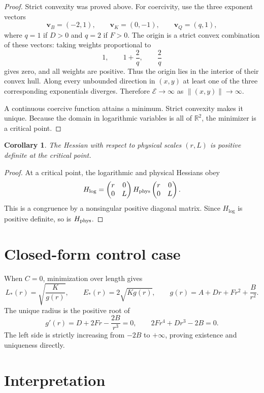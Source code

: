 \documentclass[11pt]{article}
\newtheorem{cor}{Corollary}
\begin{document}
\begin{proof}
Strict convexity was proved above. For coercivity, use the three exponent vectors
\[
\mathbf v_B=(-2,1),\qquad
\mathbf v_K=(0,-1),\qquad
\mathbf v_Q=(q,1),
\]
where $q=1$ if $D>0$ and $q=2$ if $F>0$. The origin is a strict convex combination
of these vectors: taking weights proportional to
\[
1,\qquad 1+\frac{2}{q},\qquad \frac{2}{q}
\]
gives zero, and all weights are positive. Thus the origin lies in the interior of
their convex hull. Along every unbounded direction in $(x,y)$ at least one of the
three corresponding exponentials diverges. Therefore $\mathcal E\to\infty$ as
$\|(x,y)\|\to\infty$.

A continuous coercive function attains a minimum. Strict convexity makes it unique.
Because the domain in logarithmic variables is all of $\mathbb R^2$, the minimizer
is a critical point.
\end{proof}

\begin{cor}
The Hessian with respect to physical scales $(r,L)$ is positive definite at the
critical point.
\end{cor}

\begin{proof}
At a critical point, the logarithmic and physical Hessians obey
\[
H_{\log}=
\begin{pmatrix}r&0\\0&L\end{pmatrix}
H_{\rm phys}
\begin{pmatrix}r&0\\0&L\end{pmatrix}.
\]
This is a congruence by a nonsingular positive diagonal matrix. Since $H_{\log}$ is
positive definite, so is $H_{\rm phys}$.
\end{proof}

\section{Closed-form control case}

When $C=0$, minimization over length gives
\[
L_*(r)=\sqrt{\frac{K}{g(r)}},
\qquad
E_*(r)=2\sqrt{Kg(r)},
\qquad
g(r)=A+Dr+Fr^2+\frac{B}{r^2}.
\]
The unique radius is the positive root of
\[
g'(r)=D+2Fr-\frac{2B}{r^3}=0,
\qquad
2Fr^4+Dr^3-2B=0.
\]
The left side is strictly increasing from $-2B$ to $+\infty$, proving existence and
uniqueness directly.

\section{Interpretation}
\end{document}
